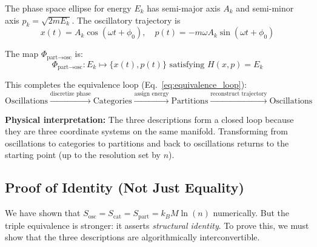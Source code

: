 \documentclass[twocolumn,10pt]{article}
\theoremstyle{remark}
\begin{document}
The phase space ellipse for energy $E_k$ has semi-major axis $A_k$ and semi-minor axis $p_k = \sqrt{2mE_k}$. The oscillatory trajectory is
\begin{equation}
    x(t) = A_k \cos(\omega t + \phi_0), \quad p(t) = -m\omega A_k \sin(\omega t + \phi_0)
    \label{eq:oscillation_from_partition}
\end{equation}

The map $\Phi_{\text{part} \to \text{osc}}$ is:
\begin{equation}
    \Phi_{\text{part} \to \text{osc}}: E_k \mapsto \{x(t), p(t)\} \text{ satisfying } H(x, p) = E_k
    \label{eq:map_part_to_osc}
\end{equation}

This completes the equivalence loop (Eq.~\eqref{eq:equivalence_loop}):
\begin{equation}
    \text{Oscillations} \xrightarrow{\text{discretize phase}} \text{Categories} \xrightarrow{\text{assign energy}} \text{Partitions} \xrightarrow{\text{reconstruct trajectory}} \text{Oscillations}
\end{equation}

\textbf{Physical interpretation:} The three descriptions form a closed loop because they are three coordinate systems on the same manifold. Transforming from oscillations to categories to partitions and back to oscillations returns to the starting point (up to the resolution set by $n$).

\subsection{Proof of Identity (Not Just Equality)}

We have shown that $S_{\text{osc}} = S_{\text{cat}} = S_{\text{part}} = k_B M \ln(n)$ numerically. But the triple equivalence is stronger: it asserts \textit{structural identity}. To prove this, we must show that the three descriptions are algorithmically interconvertible.
\end{document}
